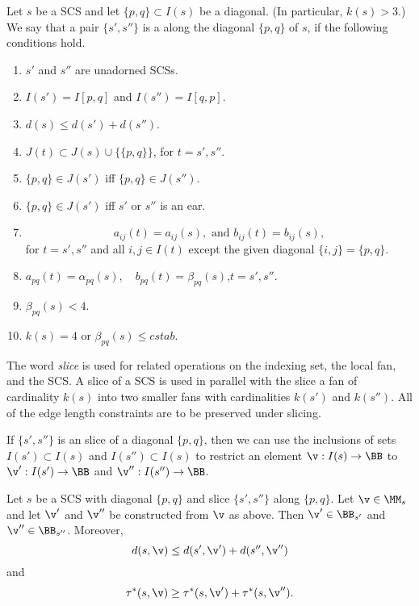\begin{definition}
 Let $s$ be a SCS and let $\{p,q\}\subset I(s)$ be a diagonal.
  (In particular, $k(s)>3$.)  We
  say that a pair $\{s',s''\}$ is a
 along  the
  diagonal $\{p,q\}$ of $s$, if the following conditions hold.
\begin{enumerate}
\item $s'$ and $s''$ are unadorned SCSs.
\item $I(s')=I[p,q]$ and $I(s'') = I[q,p]$.
\item $d(s) \le d(s') + d(s'')$.
\item $J(t) \subset J(s) \cup \{\{p,q\}\}$, for $t = s',s''$.  
\item $\{p,q\}\in J(s')$ iff $\{p,q\}\in J(s'')$.
\item $\{p,q\}\in J(s')$ iff $s'$ or $s''$ is an ear.
\item 
\[
a_{ij}(t) = a_{ij}(s), \text{ and } b_{ij}(t) = b_{ij}(s),
\]
for  $t=s',s''$ and all $i,j\in I(t)$ except the given diagonal $\{i,j\} = \{p,q\}$.
\item $a_{pq}(t) = \alpha_{pq}(s),\quad b_{pq}(t)=\beta_{pq}(s)$,\quad $t = s',s''$.
\item $\beta_{pq}(s) < 4$.
\item $k(s)=4$ or $\beta_{pq}(s) \le cstab$.
\end{enumerate}
\end{definition}


The word {\it slice} is used for related operations on the indexing
set, the local fan, and the SCS.  A slice of a
SCS is used in parallel with the slice a fan of
cardinality $k(s)$ into two smaller fans with cardinalities $k(s')$ and
$k(s'')$.  
All of the edge length constraints are to be preserved
under slicing.  

If $\{s',s''\}$ is an slice of a diagonal $\{p,q\}$, then we can use
the inclusions of sets $I(s')\subset I(s)$ and $I(s'')\subset I(s)$ to
restrict an element $\v:I(s)\to\BB$ to $\v':I(s')\to \BB$ and
$\v'':I(s'')\to \BB$.  

\begin{lemma}\label{lemma:cover2}
Let $s$ be a SCS with diagonal $\{p,q\}$ and slice
 $\{s',s''\}$ along $\{p,q\}$.
Let $\v\in \MM_s$ and let $\v'$ and $\v''$ be constructed from $\v$ as above.
Then  $\v'\in \BB_{s'}$ and $\v''\in \BB_{s''}$.
Moreover,
\begin{equation}
d(s,\v) \le d(s',\v') + d(s'',\v'')
\end{equation}
and
\begin{equation}
\tau^*(s,\v)\ge \tau^*(s,\v')+\tau^*(s,\v'').
\end{equation}
\end{lemma}

